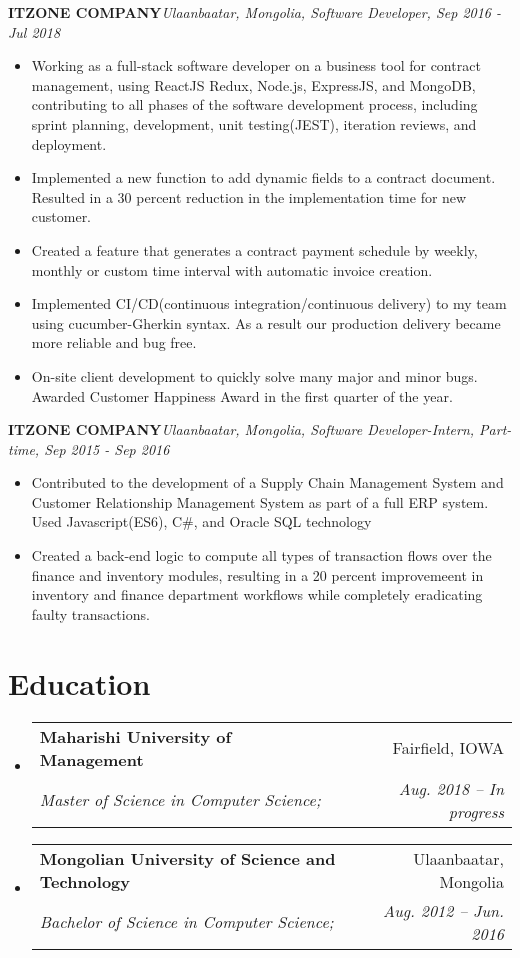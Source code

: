 \documentclass[letterpaper,11pt]{article}
\makeatletter
\newcommand{\resumeSubheading}[4]{
  \vspace{-1pt}\item
    \begin{tabular*}{0.97\textwidth}[t]{l@{\extracolsep{\fill}}r}
      \textbf{#1} & #2 \\
      \textit{\small#3} & \textit{\small #4} \\
    \end{tabular*}\vspace{-5pt}
}
\newcommand{\resumeSubHeadingListStart}{\begin{itemize}[leftmargin=*]}
\newcommand{\resumeSubHeadingListEnd}{\end{itemize}}
\newcommand{\resumeItemListStart}{\begin{itemize}}
\newcommand{\resumeItemListEnd}{\end{itemize}\vspace{-5pt}}
\makeatother
\begin{document}
      \vfill
      \textbf{ITZONE COMPANY}\hfill \textit{Ulaanbaatar, Mongolia, Software Developer, Sep 2016 - Jul 2018}
      \resumeItemListStart
        \item{
          Working as a full-stack software developer on a business tool for contract management, using ReactJS
          Redux, Node.js, ExpressJS, and MongoDB, contributing to all phases of the software development
          process, including sprint planning, development, unit testing(JEST), iteration reviews, and deployment.
        }
        \item{
          Implemented a new function to add dynamic fields to a contract document. Resulted in a 30 percent
          reduction in the implementation time for new customer.
        }
        \item{
          Created a feature that generates a contract payment schedule by weekly, monthly or custom time
          interval with automatic invoice creation.
        }
        \item{
          Implemented CI/CD(continuous integration/continuous delivery) to my team using cucumber-Gherkin
          syntax. As a result our production delivery became more reliable and bug free.
        }
        \item{
          On-site client development to quickly solve many major and minor bugs. Awarded Customer Happiness Award in the first quarter of the year.
        }
      \resumeItemListEnd

      \vfill
      \textbf{ITZONE COMPANY}\hfill \textit{Ulaanbaatar, Mongolia, Software Developer-Intern, Part-time, Sep 2015 - Sep 2016}
      \resumeItemListStart
        \item{
          Contributed to the development of a Supply Chain Management System and
          Customer Relationship Management System as part of a full ERP system. Used Javascript(ES6), C\#,
          and Oracle SQL technology
        }
        \item{
          Created a back-end logic to compute all types of transaction flows over the finance and inventory modules,
          resulting in a 20 percent improvemeent in inventory and finance department workflows while completely eradicating faulty transactions.
        }
      \resumeItemListEnd
  
\section{Education}
  \resumeSubHeadingListStart
    \resumeSubheading
      {Maharishi University of Management}{Fairfield, IOWA}
      {Master of Science in Computer Science;}{Aug. 2018 -- In progress}
    \resumeSubheading
      {Mongolian University of Science and Technology}{Ulaanbaatar, Mongolia}
      {Bachelor of Science in Computer Science;}{Aug. 2012 -- Jun. 2016}
  \resumeSubHeadingListEnd

\end{document}
